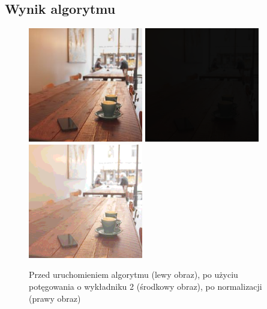 \documentclass[a4paper,12pt]{book}
\begin{document}
\subsection*{Wynik algorytmu}
\begin{figure}[H]
	\caption{Przed uruchomieniem algorytmu (lewy obraz), po użyciu potęgowania o wykładniku 2 (środkowy obraz), po normalizacji (prawy obraz)}
	\includegraphics[width=5cm, height=5cm]{coffee-unmodified.jpg}
	\includegraphics[width=5cm, height=5cm]{3-6/root-color-coffee-2.png}
	\includegraphics[width=5cm, height=5cm]{3-6/root-color-coffee-2-norm.png}
\end{figure}
\end{document}
